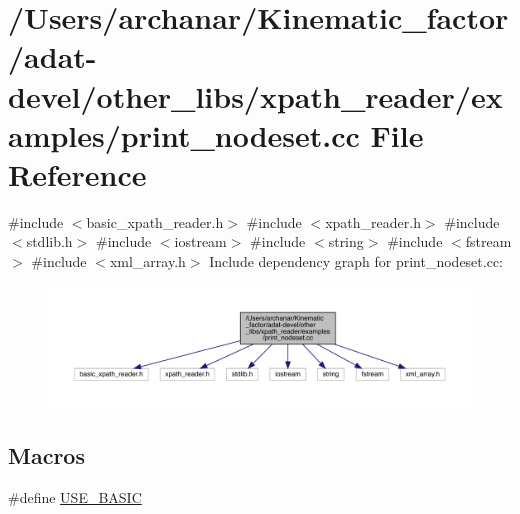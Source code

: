 \hypertarget{adat-devel_2other__libs_2xpath__reader_2examples_2print__nodeset_8cc}{}\section{/\+Users/archanar/\+Kinematic\+\_\+factor/adat-\/devel/other\+\_\+libs/xpath\+\_\+reader/examples/print\+\_\+nodeset.cc File Reference}
\label{adat-devel_2other__libs_2xpath__reader_2examples_2print__nodeset_8cc}
{\ttfamily \#include $<$basic\+\_\+xpath\+\_\+reader.\+h$>$}\newline
{\ttfamily \#include $<$xpath\+\_\+reader.\+h$>$}\newline
{\ttfamily \#include $<$stdlib.\+h$>$}\newline
{\ttfamily \#include $<$iostream$>$}\newline
{\ttfamily \#include $<$string$>$}\newline
{\ttfamily \#include $<$fstream$>$}\newline
{\ttfamily \#include $<$xml\+\_\+array.\+h$>$}\newline
Include dependency graph for print\+\_\+nodeset.\+cc\+:
\nopagebreak
\begin{figure}[H]
\begin{center}
\leavevmode
\includegraphics[width=350pt]{d6/db1/adat-devel_2other__libs_2xpath__reader_2examples_2print__nodeset_8cc__incl}
\end{center}
\end{figure}
\subsection*{Macros}
\begin{DoxyCompactItemize}
\item 
\#define \mbox{\hyperlink{adat-devel_2other__libs_2xpath__reader_2examples_2print__nodeset_8cc_a5935552aa171b1701b8bae3b001fde72}{U\+S\+E\+\_\+\+B\+A\+S\+IC}}
\end{DoxyCompactItemize}
